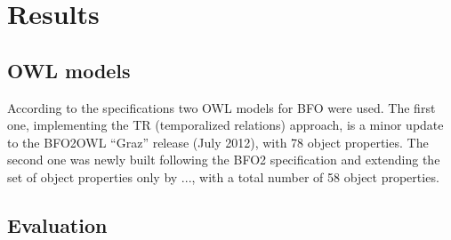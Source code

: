 \section*{Results}

\subsection*{OWL models}

According to the specifications two OWL models for BFO were used. 
The first one, implementing the TR (temporalized relations) approach, is a minor update to the BFO2OWL ``Graz'' release (July 2012), with 78 object properties. 
The second one was newly built following the BFO2 specification and extending the set of object properties only by ..., with a total number of 58 object properties. 






\subsection*{Evaluation}




